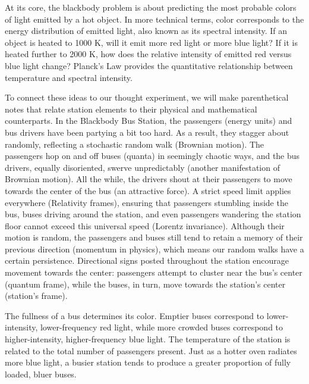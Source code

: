 \documentclass{article}
\begin{document}
At its core, the blackbody problem is about predicting the most probable colors of light emitted by a hot object. In more technical terms, color corresponds to the energy distribution of emitted light, also known as its spectral intensity. If an object is heated to 1000 K, will it emit more red light or more blue light? If it is heated further to 2000 K, how does the relative intensity of emitted red versus blue light change? Planck’s Law provides the quantitative relationship between temperature and spectral intensity.

To connect these ideas to our thought experiment, we will make parenthetical notes that relate station elements to their physical and mathematical counterparts. In the Blackbody Bus Station, the passengers (energy units) and bus drivers have been partying a bit too hard. As a result, they stagger about randomly, reflecting a stochastic random walk (Brownian motion). The passengers hop on and off buses (quanta) in seemingly chaotic ways, and the bus drivers, equally disoriented, swerve unpredictably (another manifestation of Brownian motion). All the while, the drivers shout at their passengers to move towards the center of the bus (an attractive force). A strict speed limit applies everywhere (Relativity frames), ensuring that passengers stumbling inside the bus, buses driving around the station, and even passengers wandering the station floor cannot exceed this universal speed (Lorentz invariance). Although their motion is random, the passengers and buses still tend to retain a memory of their previous direction (momentum in physics), which means our random walks have a certain persistence. Directional signs posted throughout the station encourage movement towards the center: passengers attempt to cluster near the bus’s center (quantum frame), while the buses, in turn, move towards the station’s center (station’s frame).

The fullness of a bus determines its color. Emptier buses correspond to lower-intensity, lower-frequency red light, while more crowded buses correspond to higher-intensity, higher-frequency blue light. The temperature of the station is related to the total number of passengers present. Just as a hotter oven radiates more blue light, a busier station tends to produce a greater proportion of fully loaded, bluer buses.
\end{document}
